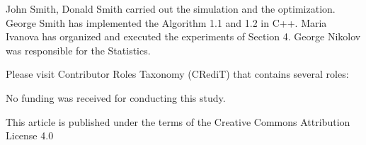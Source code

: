 \documentclass{wseas}
\begin{document}
\flushleft {}
\par{
  \noindent 
  {John Smith, Donald Smith carried out the simulation and the optimization.  }\break
  George Smith has implemented the Algorithm 1.1 and 1.2 in C++.  \break
  Maria Ivanova has organized and executed the experiments of Section 4.  \break
  George Nikolov was responsible for the Statistics.  \break

  \noindent Please visit Contributor Roles Taxonomy (CRediT) that contains several roles:
  \href{www.wseas.org/multimedia/contributor-roleinstruction.pdf}{\color{blue}{www.wseas.org/multimedia/contributor-roleinstruction.pdf}}

  \flushleft {}


  \par { \noindent No funding was received for conducting this study.}
  \break

  \flushleft {}

}
\par  {}


\flushleft {}

\par { \noindent This article is published under the terms of the Creative Commons Attribution License 4.0\\
\href{https://creativecommons.org/licenses/by/4.0/deed.en\_US}{\color{blue}{https://creativecommons.org/licenses/by/4.0/deed.en\break\_US}} }

  
\end{document}
